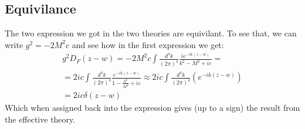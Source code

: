 \documentclass{article}
\begin{document}
\subsection{Equivilance}
The two expression we got in the two theories are equivilant. To see that, we can write $g^2 = -2M^2c$ and see how in the first expression we get:
\begin{equation}
\begin{gathered}
    g^2 D_F(z-w) = -2M^2c \int \frac{d^4k}{(2\pi)^4}\frac{ie^{-ik(z - w)}}{k^2 - M^2 + i\varepsilon} = \\ =
    2ic \int \frac{d^4k}{(2\pi)^4}\frac{e^{-ik(z - w)}}{1 - \frac{k^2}{M^2} + i\varepsilon} \approx 2ic \int \frac{d^4k}{(2\pi)^4}\left(e^{-ik(z - w)}\right) \\ = 2ic\delta(z - w)
\end{gathered}
\end{equation}
Which when assigned back into the expression gives (up to a sign) the result from the effective theory.
\end{document}
